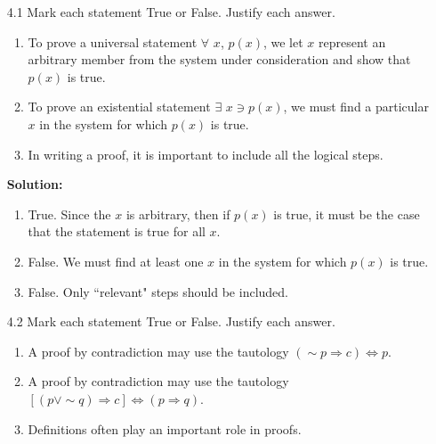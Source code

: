 \begin{enumerate}
   \item[4.1]  Mark each statement True or False. Justify each answer.
               \begin{enumerate}
                  \item To prove a universal statement $\forall$ $x$, $p(x)$, we 
                        let $x$ represent an arbitrary member from the system 
                        under consideration and show that $p(x)$ is true.
                  \item To prove an existential statement
                        $\exists$ $x \ni p(x)$, we must find a particular $x$ in 
                        the system for which $p(x)$ is true.
                  \item In writing a proof, it is important to include all the 
                        logical steps.
               \end{enumerate}

      \textbf{Solution:} 

      \begin{enumerate}
         \item True. Since the $x$ is arbitrary, then if $p(x)$ is true, it must
               be the case that the statement is true for all $x$.
         \item False. We must find at least one $x$ in the system for which
               $p(x)$ is true.
         \item False. Only ``relevant" steps should be included.
      \end{enumerate}
   \item[4.2]  Mark each statement True or False. Justify each answer.
               \begin{enumerate}
                  \item A proof by contradiction may use the tautology
                        $({\sim}p \Rightarrow c) \Leftrightarrow p$.
                  \item A proof by contradiction may use the tautology
                        $[(p \lor {\sim}q) \Rightarrow c] \Leftrightarrow
                        (p \Rightarrow q)$.
                  \item Definitions often play an important role in proofs.
               \end{enumerate}


\end{enumerate}
